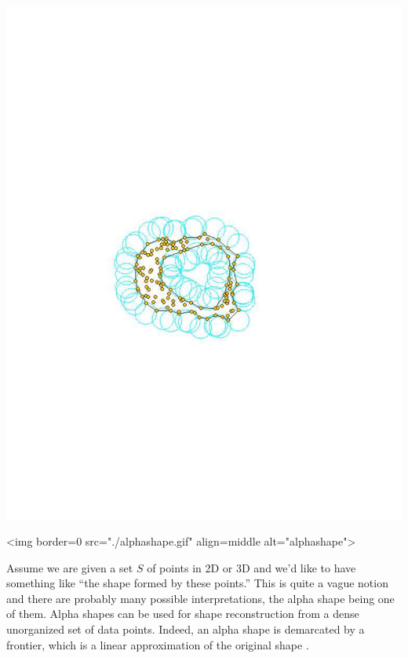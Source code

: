 \begin{ccTexOnly}
\begin{center}
\includegraphics{Alpha_shapes_3/alphashape} 
\end{center}
\end{ccTexOnly}
\begin{ccHtmlOnly}
<img border=0 src="./alphashape.gif"  align=middle  alt="alphashape">
\end{ccHtmlOnly}

Assume we are given a set $S$ of points in 2D or 3D and we'd like to
have something like ``the shape formed by these points.'' This is
quite a vague notion and there are probably many possible
interpretations, the alpha shape  being one of them. Alpha shapes
can be used for shape reconstruction from a dense unorganized set of
data points. Indeed, an alpha shape  is demarcated by a frontier,
which is a linear approximation of the original shape \cite{bb-srmua-97t}.

